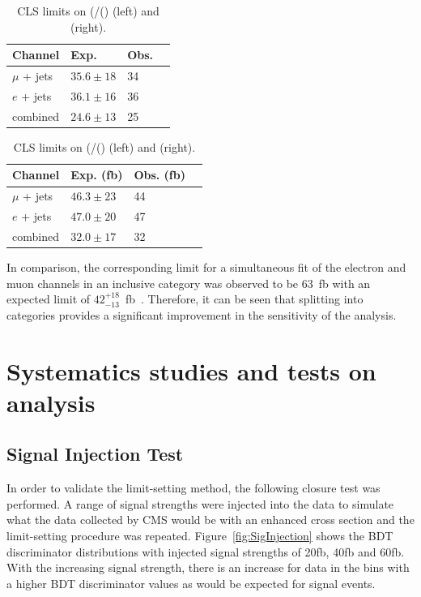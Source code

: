 \begin{table}[ht!]
\centering
\begin{tabular}{| l | l | l | p{1cm} |}
 \hline 
 Channel & Exp.  &Obs. \\
   \hline
 $\mu$ + jets & $35.6\pm 18$ & 34 \\
  \hline
$e$ + jets &  $36.1\pm16$  & 36  \\
\hline
 combined & $24.6\pm13$  & 25   \\
\hline
\end{tabular}
\hspace{0.5cm}
\begin{tabular}{| l | l | l | p{1cm} |}
 \hline 
 Channel & Exp. (fb) &Obs. (fb) \\
   \hline
 $\mu$ + jets & $46.3\pm23$ & 44 \\
  \hline
$e$ + jets &  $47.0\pm20$  & 47  \\
\hline
 combined & $32.0\pm17$  & 32   \\
\hline
\end{tabular}
\caption{CLS limits on (\sigmatttt/(\sigmattttSM) (left) and \sigmatttt (right). }
\label{tab:lims}
\end{table}

In comparison, the corresponding limit for a simultaneous fit of the electron and muon channels in an inclusive \njets category was observed to be 63~fb with an expected limit of  $42^{+18}_{-13}$~fb~\cite{CMS-PAS-TOP-13-012}. Therefore, it can be seen that splitting into \njets categories provides a significant improvement in the sensitivity of the analysis.

\section{Systematics studies and tests on analysis\label{studies8}}

\subsection{Signal Injection Test}
\label{sec:signalinjection}
In order to validate the limit-setting method, the following closure test was performed. A range of signal strengths were injected into the data to simulate what the data collected by CMS would be with an enhanced \tttt cross section and the limit-setting procedure was repeated. Figure~\ref{fig:SigInjection} shows the BDT discriminator distributions with injected signal strengths of 20fb, 40fb and 60fb. With the increasing signal strength, there is an increase for data in the bins with a higher BDT discriminator values as would be expected for signal events.

